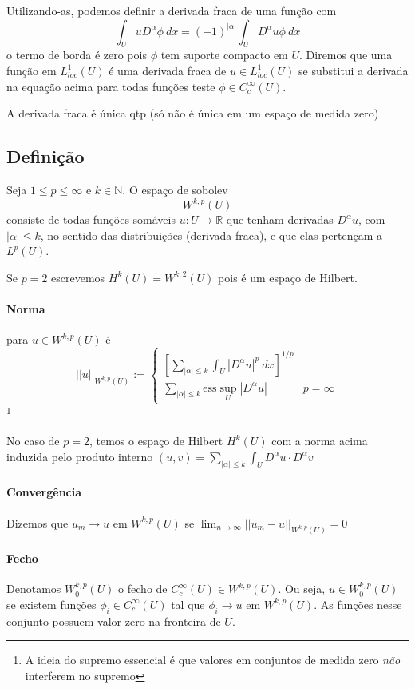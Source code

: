 \documentclass[11pt]{article}
\newcommand{\N}{\mathbb{N}}
\newcommand{\R}{\mathbb{R}}
\begin{document}
Utilizando-as, podemos definir a derivada fraca de uma função com \[ \int_U u D^\alpha\phi\ dx = (-1)^{|\alpha|} \int_U D^\alpha u \phi\ dx \] o termo de borda é zero pois \( \phi \) tem suporte compacto em \( U \). Diremos que uma função em \( L^1_{loc}(U) \) é uma derivada fraca de \( u \in L^1_{loc}(U) \) se substitui a derivada na equação acima para todas funções teste \( \phi \in C^\infty_c(U) \).

A derivada fraca é única qtp (só não é única em um espaço de medida zero)

\subsection*{Definição}

Seja \( 1\leq p \leq \infty \) e \( k \in \N \). O espaço de sobolev \[ W^{k,p}(U) \] consiste de todas funções somáveis \( u:U\rightarrow\R \) que tenham derivadas \( D^\alpha u \), com \( |\alpha|\leq k \), no sentido das distribuições (derivada fraca), e que elas pertençam a \( L^p(U) \).

Se \( p=2 \) escrevemos \( H^k(U) = W^{k,2}(U) \) pois é um espaço de Hilbert.

\paragraph{Norma} para \( u \in W^{k,p}(U) \) é \[ ||u||_{W^{k,p}(U)} := \begin{cases}
	\left[ \sum_{|\alpha|\leq k} \int_U \left| D^{\alpha} u\right|^p\ dx  \right]^{1/p}\\
	\sum_{|\alpha|\leq k} \text{ess}\sup_U \left| D^{\alpha} u \right| & p=\infty
\end{cases}\]\footnote{A ideia do supremo essencial é que valores em conjuntos de medida zero \textit{não} interferem no supremo}

No caso de \( p=2 \), temos o espaço de Hilbert \( H^k(U) \) com a norma acima induzida pelo produto interno \( (u,v) =\sum_{|\alpha|\leq k} \int_U D^{\alpha}u \cdot D^\alpha v   \)

\paragraph{Convergência} Dizemos que \( u_m \rightarrow u\) em \( W^{k,p}(U) \) se \( \lim_{n\rightarrow \infty} ||u_m - u||_{W^{k,p}(U)} =0\)

\paragraph{Fecho} Denotamos \( W^{k,p}_0 (U) \) o fecho de \( C^{\infty}_c(U) \in W^{k,p}(U) \). Ou seja, \( u \in W^{k,p}_0(U) \) se existem funções \( \phi_i \in C^{\infty}_c(U) \) tal que \( \phi_i \rightarrow u \) em \( W^{k,p}(U) \). As funções nesse conjunto possuem valor zero na fronteira de \( U \).
\end{document}
